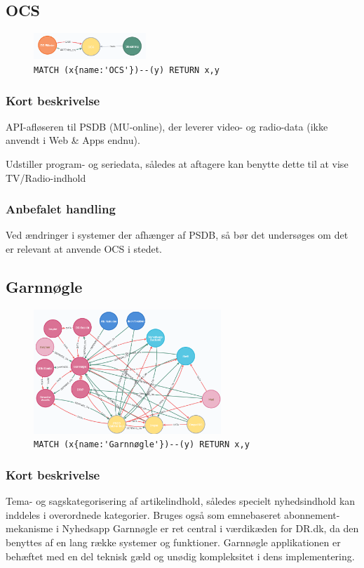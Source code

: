 \documentclass{article}
\begin{document}
\subsection{OCS}
\begin{figure}[H]
\includegraphics[width=120pt]{OCS.PNG}
\cprotect\caption{\verb|MATCH (x{name:'OCS'})--(y) RETURN x,y|}
\end{figure}
\subsubsection*{Kort beskrivelse}
API-afløseren til PSDB (MU-online), der leverer video- og radio-data (ikke anvendt i Web \& Apps endnu).

Udstiller program- og seriedata, således at aftagere kan benytte dette til at vise TV/Radio-indhold
\subsubsection*{Anbefalet handling}
Ved ændringer i systemer der afhænger af PSDB, så bør det undersøges om det er relevant at anvende OCS i stedet.



\subsection{Garnnøgle}
\begin{figure}[H]
\includegraphics[width=200pt]{Garnnoegle.PNG}
\cprotect\caption{\verb|MATCH (x{name:'Garnnøgle'})--(y) RETURN x,y|}
\end{figure}
\subsubsection*{Kort beskrivelse}
Tema- og sagskategorisering af artikelindhold, således specielt nyhedsindhold kan inddeles i overordnede kategorier. Bruges også som emnebaseret abonnement-mekanisme i Nyhedsapp
Garnnøgle er ret central i værdikæden for DR.dk, da den benyttes af en lang række systemer og funktioner. Garnnøgle applikationen er behæftet med en del teknisk gæld og unødig kompleksitet i dens implementering.
\end{document}
